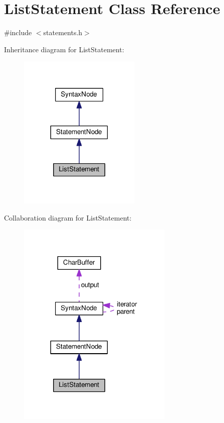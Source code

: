 \hypertarget{classListStatement}{}\section{List\+Statement Class Reference}
\label{classListStatement}


{\ttfamily \#include $<$statements.\+h$>$}



Inheritance diagram for List\+Statement\+:\nopagebreak
\begin{figure}[H]
\begin{center}
\leavevmode
\includegraphics[width=165pt]{classListStatement__inherit__graph}
\end{center}
\end{figure}


Collaboration diagram for List\+Statement\+:\nopagebreak
\begin{figure}[H]
\begin{center}
\leavevmode
\includegraphics[width=210pt]{classListStatement__coll__graph}
\end{center}
\end{figure}

